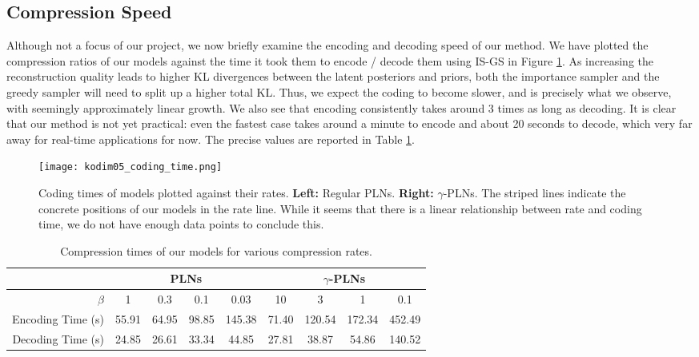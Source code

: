 \subsection{Compression Speed}
\par
Although not a focus of our project, we now briefly examine the encoding and
decoding speed of our method. We have plotted the compression ratios of our
models against the time it took them to encode / decode them using IS-GS in
Figure \ref{fig:kodim05_coding_time}. As increasing the reconstruction quality
leads to higher KL divergences between the latent posteriors and priors, both the
importance sampler and the greedy sampler will need to split up a higher total
KL. Thus, we expect the coding to become slower, and is precisely what we
observe, with seemingly approximately linear growth. We also see that encoding
consistently takes around 3 times as long as decoding. It is clear that our
method is not yet practical:
even the fastest case takes around a minute to encode and about 20 seconds to
decode, which very far away for real-time applications for now. The precise
values are reported in Table \ref{tab:kodim05_coding_time}.
\begin{figure}
  \centering
  \texttt{[image: kodim05\_coding\_time.png]}
  \caption[Coding times of models plotted against their rates.]
  {Coding times of models plotted against their rates. \textbf{Left:}
    Regular PLNs. \textbf{Right:} $\gamma$-PLNs. The striped lines indicate
    the concrete positions of our models in the rate line. While it seems
    that there is a
    linear relationship between rate and coding time, we do not have enough
    data points to conclude this.}
  \label{fig:kodim05_coding_time}
\end{figure}

\begin{table}[]
  \centering
  \begin{tabular}{|r||c|c|c|c||c|c|c|c|}
    \hline
    & \multicolumn{4}{c||}{\textbf{PLNs}} & \multicolumn{4}{c|}{\textbf{$\gamma$-PLNs}} \\
    \hline 
    $\beta$ & 1 & 0.3 & 0.1 & 0.03 & 10 & 3 & 1 & 0.1 \\ 
    \hline\hline
    Encoding Time (s) & 55.91 & 64.95 & 98.85 & 145.38 & 71.40 & 120.54 & 172.34 & 452.49 \\
    \hline
    Decoding Time (s) & 24.85 & 26.61 & 33.34 & 44.85 & 27.81 & 38.87 & 54.86 & 140.52 \\
    \hline
  \end{tabular}
  \caption{Compression times of our models for various compression rates.}
  \label{tab:kodim05_coding_time}
\end{table}